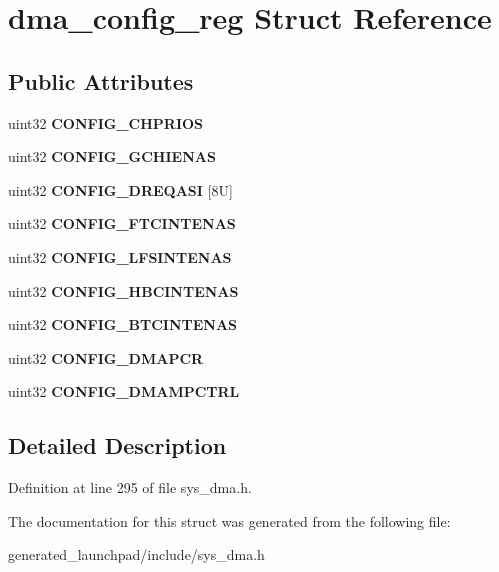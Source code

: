 \hypertarget{structdma__config__reg}{}\section{dma\+\_\+config\+\_\+reg Struct Reference}
\label{structdma__config__reg}
\subsection*{Public Attributes}
\begin{DoxyCompactItemize}
\item 
\mbox{\label{structdma__config__reg_a66623be50b2450873e2a5a9ca3d7e1e3}} 
uint32 {\bfseries C\+O\+N\+F\+I\+G\+\_\+\+C\+H\+P\+R\+I\+OS}
\item 
\mbox{\label{structdma__config__reg_af703bd19e20ec973e9868e27246511d9}} 
uint32 {\bfseries C\+O\+N\+F\+I\+G\+\_\+\+G\+C\+H\+I\+E\+N\+AS}
\item 
\mbox{\label{structdma__config__reg_acbc8b06365347ecb01160fd74e151c19}} 
uint32 {\bfseries C\+O\+N\+F\+I\+G\+\_\+\+D\+R\+E\+Q\+A\+SI} \mbox{[}8\+U\mbox{]}
\item 
\mbox{\label{structdma__config__reg_ad4d6d8bcaeee36c8ddb6728780a250ae}} 
uint32 {\bfseries C\+O\+N\+F\+I\+G\+\_\+\+F\+T\+C\+I\+N\+T\+E\+N\+AS}
\item 
\mbox{\label{structdma__config__reg_aa04ab0aa102a9e95dd907225499e711e}} 
uint32 {\bfseries C\+O\+N\+F\+I\+G\+\_\+\+L\+F\+S\+I\+N\+T\+E\+N\+AS}
\item 
\mbox{\label{structdma__config__reg_a8275a07d12a60e1685b3974ec5de7f34}} 
uint32 {\bfseries C\+O\+N\+F\+I\+G\+\_\+\+H\+B\+C\+I\+N\+T\+E\+N\+AS}
\item 
\mbox{\label{structdma__config__reg_a26e1f7dcd7525d35db10f8e48721c0d0}} 
uint32 {\bfseries C\+O\+N\+F\+I\+G\+\_\+\+B\+T\+C\+I\+N\+T\+E\+N\+AS}
\item 
\mbox{\label{structdma__config__reg_ade2b21227b2c3bd3c7375217912898b5}} 
uint32 {\bfseries C\+O\+N\+F\+I\+G\+\_\+\+D\+M\+A\+P\+CR}
\item 
\mbox{\label{structdma__config__reg_abfcfd361a3f5872ce48ea846a58a9ce0}} 
uint32 {\bfseries C\+O\+N\+F\+I\+G\+\_\+\+D\+M\+A\+M\+P\+C\+T\+RL}
\end{DoxyCompactItemize}


\subsection{Detailed Description}


Definition at line 295 of file sys\+\_\+dma.\+h.



The documentation for this struct was generated from the following file\+:\begin{DoxyCompactItemize}
\item 
generated\+\_\+launchpad/include/sys\+\_\+dma.\+h\end{DoxyCompactItemize}
